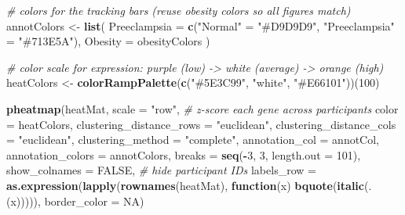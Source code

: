 \documentclass[
]{article}
\newenvironment{Shaded}{\begin{snugshade}}{\end{snugshade}}
\newcommand{\AttributeTok}[1]{\textcolor[rgb]{0.13,0.29,0.53}{#1}}
\newcommand{\CommentTok}[1]{\textcolor[rgb]{0.56,0.35,0.01}{\textit{#1}}}
\newcommand{\ConstantTok}[1]{\textcolor[rgb]{0.56,0.35,0.01}{#1}}
\newcommand{\ControlFlowTok}[1]{\textcolor[rgb]{0.13,0.29,0.53}{\textbf{#1}}}
\newcommand{\DecValTok}[1]{\textcolor[rgb]{0.00,0.00,0.81}{#1}}
\newcommand{\FunctionTok}[1]{\textcolor[rgb]{0.13,0.29,0.53}{\textbf{#1}}}
\newcommand{\NormalTok}[1]{#1}
\newcommand{\OtherTok}[1]{\textcolor[rgb]{0.56,0.35,0.01}{#1}}
\newcommand{\SpecialCharTok}[1]{\textcolor[rgb]{0.81,0.36,0.00}{\textbf{#1}}}
\newcommand{\StringTok}[1]{\textcolor[rgb]{0.31,0.60,0.02}{#1}}
\begin{document}
\begin{Shaded}
\begin{Highlighting}[]
\CommentTok{\# colors for the tracking bars (reuse obesity colors so all figures match)}
\NormalTok{annotColors }\OtherTok{\textless{}{-}} \FunctionTok{list}\NormalTok{(}
  \AttributeTok{Preeclampsia =} \FunctionTok{c}\NormalTok{(}\StringTok{"Normal"} \OtherTok{=} \StringTok{"\#D9D9D9"}\NormalTok{, }\StringTok{"Preeclampsia"} \OtherTok{=} \StringTok{"\#713E5A"}\NormalTok{),}
  \AttributeTok{Obesity      =}\NormalTok{ obesityColors}
\NormalTok{)}

\CommentTok{\# color scale for expression: purple (low) {-}\textgreater{} white (average) {-}\textgreater{} orange (high)}
\NormalTok{heatColors }\OtherTok{\textless{}{-}} \FunctionTok{colorRampPalette}\NormalTok{(}\FunctionTok{c}\NormalTok{(}\StringTok{"\#5E3C99"}\NormalTok{, }\StringTok{"white"}\NormalTok{, }\StringTok{"\#E66101"}\NormalTok{))(}\DecValTok{100}\NormalTok{)}

\FunctionTok{pheatmap}\NormalTok{(heatMat,}
         \AttributeTok{scale =} \StringTok{"row"}\NormalTok{,               }\CommentTok{\# z{-}score each gene across participants}
         \AttributeTok{color =}\NormalTok{ heatColors,}
         \AttributeTok{clustering\_distance\_rows =} \StringTok{"euclidean"}\NormalTok{,}
         \AttributeTok{clustering\_distance\_cols =} \StringTok{"euclidean"}\NormalTok{,}
         \AttributeTok{clustering\_method =} \StringTok{"complete"}\NormalTok{,}
         \AttributeTok{annotation\_col =}\NormalTok{ annotCol, }
         \AttributeTok{annotation\_colors =}\NormalTok{ annotColors,}
         \AttributeTok{breaks =} \FunctionTok{seq}\NormalTok{(}\SpecialCharTok{{-}}\DecValTok{3}\NormalTok{, }\DecValTok{3}\NormalTok{, }\AttributeTok{length.out =} \DecValTok{101}\NormalTok{),}
         \AttributeTok{show\_colnames =} \ConstantTok{FALSE}\NormalTok{,        }\CommentTok{\# hide participant IDs}
         \AttributeTok{labels\_row =} \FunctionTok{as.expression}\NormalTok{(}\FunctionTok{lapply}\NormalTok{(}\FunctionTok{rownames}\NormalTok{(heatMat),}
                                           \ControlFlowTok{function}\NormalTok{(x) }\FunctionTok{bquote}\NormalTok{(}\FunctionTok{italic}\NormalTok{(.(x))))),}
         \AttributeTok{border\_color =} \ConstantTok{NA}\NormalTok{)}
\end{Highlighting}
\end{Shaded}
\end{document}
